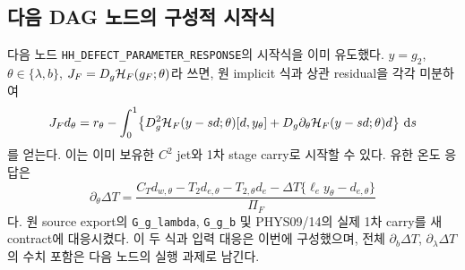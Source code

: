 \subsection{다음 DAG 노드의 구성적 시작식}
다음 노드 \texttt{HH\_DEFECT\_PARAMETER\_RESPONSE}의 시작식을 이미 유도했다. $y=g_2$, $\theta\in\{\lambda,b\}$, $J_F=D_g\mathcal H_F(g_F;\theta)$라 쓰면, 원 implicit 식과 상관 residual을 각각 미분하여
\begin{equation}
J_Fd_\theta=r_\theta-\int_0^1\!\left\{
D_g^2\mathcal H_F(y-sd;\theta)[d,y_\theta]
+D_g\partial_\theta\mathcal H_F(y-sd;\theta)d\right\}\,\mathrm d s
\label{eq:nextresponse}
\end{equation}
를 얻는다. 이는 이미 보유한 $C^2$ jet와 1차 stage carry로 시작할 수 있다. 유한 온도 응답은
\begin{equation}
\partial_\theta\Delta T=
\frac{C_Td_{w,\theta}-T_2d_{e,\theta}-T_{2,\theta}d_e
-\Delta T\{\ell_e y_\theta-d_{e,\theta}\}}{\Pi_F}
\label{eq:nexttemperature}
\end{equation}
다. 원 source export의 \texttt{G\_g\_lambda}, \texttt{G\_g\_b} 및 PHYS09/14의 실제 1차 carry를 새 contract에 대응시켰다. 이 두 식과 입력 대응은 이번에 구성했으며, 전체 $\partial_b\Delta T$, $\partial_\lambda\Delta T$의 수치 포함은 다음 노드의 실행 과제로 남긴다.\cite{next16}
